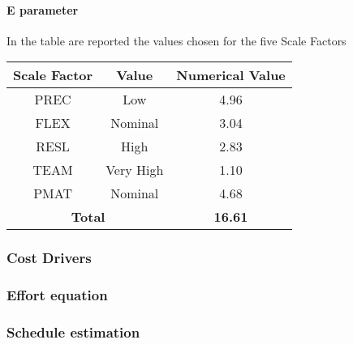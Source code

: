 \paragraph{E parameter}In the table are reported the values chosen for the five Scale Factors
\begin{longtable}{ccc}
\toprule
Scale Factor&Value&Numerical Value\\
\midrule
PREC&Low&4.96\\
FLEX&Nominal&3.04\\
RESL&High&2.83\\
TEAM&Very High&1.10\\
PMAT&Nominal&4.68\\
\midrule
\multicolumn{2}{c}{\textbf{Total}}&\textbf{16.61}\\
\bottomrule
\end{longtable}


\subsubsection{Cost Drivers}

\subsubsection{Effort equation}

\subsubsection{Schedule estimation }